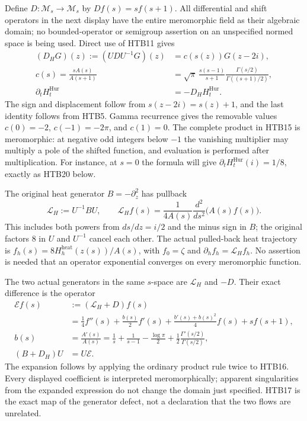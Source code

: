 Define $D:\mathcal M_s\to\mathcal M_s$ by $Df(s)=s f(s+1)$.
All differential and shift operators in the next display have the
entire meromorphic field as their algebraic domain; no bounded-operator
or semigroup assertion on an unspecified normed space is being used.
Direct use of HTB11 gives
\begin{equation}\tag{HTB15}
\begin{split}
 (D_H G)(z):=(UDU^{-1}G)(z)
 &=c(s(z))G(z-2i),\\
 c(s)=\frac{sA(s)}{A(s+1)}
 &=\sqrt{\pi}\,\frac{s(s-1)}{s+1}
       \frac{\Gamma(s/2)}{\Gamma((s+1)/2)},\\
 \partial_tH_t^{\mathrm{Hur}}&=-D_HH_t^{\mathrm{Hur}}.
\end{split}
\end{equation}
The sign and displacement follow from $s(z-2i)=s(z)+1$, and the last
identity follows from HTB5. Gamma recurrence gives the removable values
$c(0)=-2$, $c(-1)=-2\pi$, and $c(1)=0$. The complete product in HTB15
is meromorphic: at negative odd integers below $-1$ the vanishing
multiplier may multiply a pole of the shifted function, and evaluation
is performed after multiplication. For instance, at $s=0$ the formula
will give $\partial_tH_t^{\mathrm{Hur}}(i)=1/8$, exactly as HTB20 below.

The original heat generator $B=-\partial_z^2$ has pullback
\begin{equation}\tag{HTB16}
 \mathcal L_H:=U^{-1}BU,\qquad
 \mathcal L_H f(s)=\frac1{4A(s)}\frac{d^2}{ds^2}\bigl(A(s)f(s)\bigr).
\end{equation}
This includes both powers from $ds/dz=i/2$ and the minus sign in $B$;
the original factors $8$ in $U$ and $U^{-1}$ cancel each other.
The actual pulled-back heat trajectory is
$f_h(s)=8H_h^{\mathrm{heat}}(z(s))/A(s)$, with $f_0=\zeta$ and
$\partial_hf_h=\mathcal L_H f_h$. No assertion is needed that an
operator exponential converges on every meromorphic function.

The two actual generators in the same $s$-space are $\mathcal L_H$ and
$-D$. Their exact difference is the operator
\begin{equation}\tag{HTB17}
\begin{split}
 \mathcal E f(s)
 &:=(\mathcal L_H+D)f(s)\\
 &=\frac14 f''(s)+\frac{b(s)}2f'(s)
   +\frac{b'(s)+b(s)^2}{4}f(s)+s f(s+1),\\
 b(s)&=\frac{A'(s)}{A(s)}
 =\frac1s+\frac1{s-1}-\frac{\log\pi}{2}
       +\frac12\frac{\Gamma'(s/2)}{\Gamma(s/2)},\\
 (B+D_H)U&=U\mathcal E.
\end{split}
\end{equation}
The expansion follows by applying the ordinary product rule twice to
HTB16. Every displayed coefficient is interpreted meromorphically;
apparent singularities from the expanded expression do not change the
domain just specified. HTB17 is the exact map of the generator defect,
not a declaration that the two flows are unrelated.

